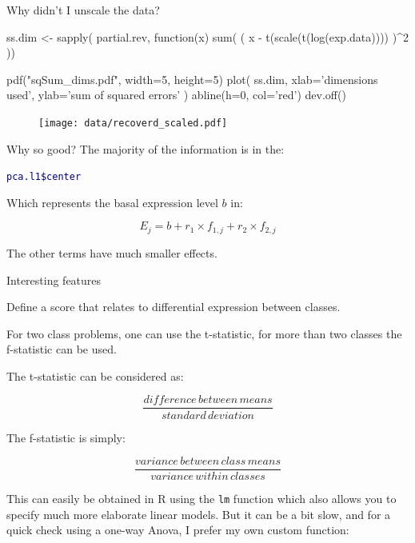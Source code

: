\documentclass[pdf]{beamer}
\begin{document}
\begin{frame}[fragile]{Why didn't I unscale the data?}
  \begin{rcode}
  ss.dim <- sapply( partial.rev, function(x){
    sum( ( x - t(scale(t(log(exp.data)))) )^2 )})
  
  pdf("sqSum_dims.pdf", width=5, height=5)
  plot( ss.dim, xlab='dimensions used', ylab='sum of squared errors' )
  abline(h=0, col='red')
  dev.off()
  \end{rcode}
  \pause
  \vspace{-0.5cm}
  \begin{figure}[ht]
    \texttt{[image: data/recoverd\_scaled.pdf]}
  \end{figure}
\end{frame}

\begin{frame}[fragile]{Why so good?}
  The majority of the information is in the:

  \textcolor{navy}{\texttt{pca.l1\$center} }
  
  Which represents the basal expression level $b$ in:

  $$
    E_j = b + r_1\times f_{1,j} + r_2\times f_{2,j}
  $$
  
    The other terms have much smaller effects.

\end{frame}

\begin{frame}{Interesting features}
  
  {\small
  Define a score that relates to differential expression between
  classes.

  For two class problems, one can use the t-statistic, for more than two
  classes the f-statistic can be used.

  The t-statistic can be considered as:
  
  $$ \frac{difference\, between\, means}{standard\, deviation} $$

  The f-statistic is simply:
  
  $$ \frac{variance\, between\, class\, means}{variance\, within\, classes} $$

  This can easily be obtained in R using the \texttt{lm} function which also allows
  you to specify much more elaborate linear models. But it can be a bit slow, and
  for a quick check using a one-way Anova, I prefer my own custom function:
}
\end{frame}
\end{document}

